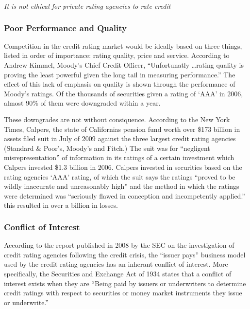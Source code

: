 \documentclass[11pt]{article}
\begin{document}
\begin{multicols}{2}
\textit{It is not ethical for private rating agencies to rate credit}

\subsubsection{Poor Performance and Quality}

Competition in the credit rating market would be ideally based on three things, listed in order of importance: rating quality, price and service. \cite[p. 210]{govtReport} According to Andrew Kimmel, Moody's Chief Credit Officer, ``Unfortunatly \ldots rating quality is proving the least powerful given the long tail in measuring performance.''  The effect of this lack of emphasis on quality is shown through the performance of Moody's ratings.  Of the thousands of securities given a rating of `AAA' in 2006, almost 90\% of them were downgraded within a year. \cite{ratingEthics, govtReport}

These downgrades are not without consiquence.  According to the New York Times, Calpers, the state of Californias pension fund worth over \$173 billion in assets filed suit in July of 2009 against the three largest credit rating agencies (Standard \& Poor's, Moody's and Fitch.) The suit was for ``negligent misrepresentation'' of information in its ratings of a certain investment which Calpers invested \$1.3 billion in 2006.  Calpers invested in securities based on the rating agencies `AAA' rating, of which the suit says the ratings ``proved to be wildly inaccurate and unreasonably high'' and the method in which the ratings were determined was ``seriously flawed in conception and incompetently applied.''  this resulted in over a billion in losses. \cite{nyTimesCalpers} 

\subsubsection{Conflict of Interest}

According to the report published in 2008 by the SEC on the investigation of credit rating agencies following the credit crisis, the ``issuer pays'' business model used by the credit rating agencies has an inherant conflict of interest. \cite[p. 23]{secCRAreport}  More specifically, the Securities and Exchange Act of 1934 states that a conflict of interest exists when they are ``Being paid by issuers or underwriters to determine credit ratings with respect to securities or money market instruments they issue or underwrite.'' \cite[Rule 17g-5(b)(1)]{SEA} 


\end{multicols}
\end{document}

